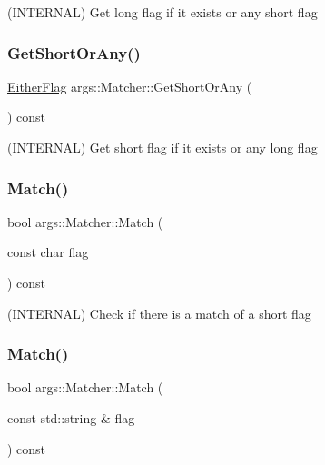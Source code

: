 (I\+N\+T\+E\+R\+N\+AL) Get long flag if it exists or any short flag \mbox{\label{classargs_1_1_matcher_a41ff39211bfb881c95b69b9d4e1e3b00}} 
\subsubsection{\texorpdfstring{Get\+Short\+Or\+Any()}{GetShortOrAny()}}
{\footnotesize\ttfamily \hyperlink{structargs_1_1_either_flag}{Either\+Flag} args\+::\+Matcher\+::\+Get\+Short\+Or\+Any (\begin{DoxyParamCaption}{ }\end{DoxyParamCaption}) const\hspace{0.3cm}{\ttfamily [inline]}}

(I\+N\+T\+E\+R\+N\+AL) Get short flag if it exists or any long flag \mbox{\label{classargs_1_1_matcher_ac0109d749d161b039d879e2c6b4b708c}} 
\subsubsection{\texorpdfstring{Match()}{Match()}\hspace{0.1cm}{\footnotesize\ttfamily [1/3]}}
{\footnotesize\ttfamily bool args\+::\+Matcher\+::\+Match (\begin{DoxyParamCaption}\item[{const char}]{flag }\end{DoxyParamCaption}) const\hspace{0.3cm}{\ttfamily [inline]}}

(I\+N\+T\+E\+R\+N\+AL) Check if there is a match of a short flag \mbox{\label{classargs_1_1_matcher_aa61c6a4d756752ec692c0b703035608a}} 
\subsubsection{\texorpdfstring{Match()}{Match()}\hspace{0.1cm}{\footnotesize\ttfamily [2/3]}}
{\footnotesize\ttfamily bool args\+::\+Matcher\+::\+Match (\begin{DoxyParamCaption}\item[{const std\+::string \&}]{flag }\end{DoxyParamCaption}) const\hspace{0.3cm}{\ttfamily [inline]}}

